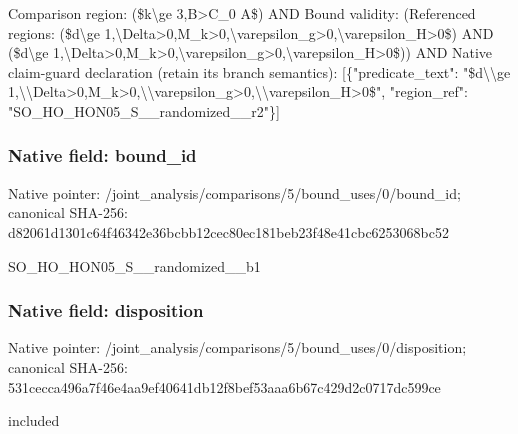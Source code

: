 \documentclass[10pt,a4paper]{article}
\begin{document}
\begingroup\raggedright\sloppy Comparison region:\allowbreak{} (\$k\textbackslash{}ge 3,\allowbreak{}B>C\_\allowbreak{}0 A\$) AND Bound validity:\allowbreak{} (Referenced regions:\allowbreak{} (\$d\textbackslash{}ge 1,\allowbreak{}\textbackslash{}Delta>0,\allowbreak{}M\_\allowbreak{}k>0,\allowbreak{}\textbackslash{}varepsilon\_\allowbreak{}g>0,\allowbreak{}\textbackslash{}varepsilon\_\allowbreak{}H>0\$) AND (\$d\textbackslash{}ge 1,\allowbreak{}\textbackslash{}Delta>0,\allowbreak{}M\_\allowbreak{}k>0,\allowbreak{}\textbackslash{}varepsilon\_\allowbreak{}g>0,\allowbreak{}\textbackslash{}varepsilon\_\allowbreak{}H>0\$)) AND Native claim-guard declaration (retain its branch semantics):\allowbreak{} [\{"predicate\_\allowbreak{}text":\allowbreak{} "\$d\textbackslash{}\textbackslash{}ge 1,\allowbreak{}\textbackslash{}\textbackslash{}Delta>0,\allowbreak{}M\_\allowbreak{}k>0,\allowbreak{}\textbackslash{}\textbackslash{}varepsilon\_\allowbreak{}g>0,\allowbreak{}\textbackslash{}\textbackslash{}varepsilon\_\allowbreak{}H>0\$",\allowbreak{} "region\_\allowbreak{}ref":\allowbreak{} "SO\_\allowbreak{}HO\_\allowbreak{}HON05\_\allowbreak{}S\_\allowbreak{}\_\allowbreak{}randomized\_\allowbreak{}\_\allowbreak{}r2"\}]\par\endgroup

\subsubsection{Native field: bound\_\allowbreak{}id}
Native pointer: /joint\_\allowbreak{}analysis/comparisons/5/bound\_\allowbreak{}uses/0/bound\_\allowbreak{}id; canonical SHA-256: d82061d1301c64f46342e36bcbb12cec80ec181beb23f48e41cbc6253068bc52

\begingroup\raggedright\sloppy SO\_\allowbreak{}HO\_\allowbreak{}HON05\_\allowbreak{}S\_\allowbreak{}\_\allowbreak{}randomized\_\allowbreak{}\_\allowbreak{}b1\par\endgroup

\subsubsection{Native field: disposition}
Native pointer: /joint\_\allowbreak{}analysis/comparisons/5/bound\_\allowbreak{}uses/0/disposition; canonical SHA-256: 531cecca496a7f46e4aa9ef40641db12f8bef53aaa6b67c429d2c0717dc599ce

\begingroup\raggedright\sloppy included\par\endgroup
\end{document}
